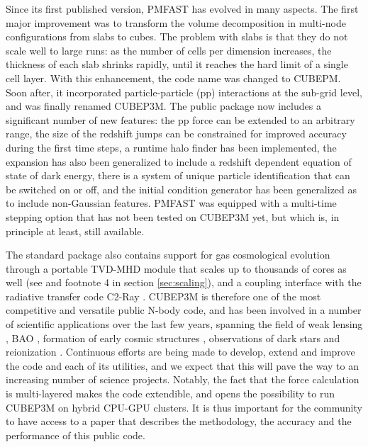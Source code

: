 \documentclass[useAMS,usenatbib]{mn2e}
\begin{document}
Since its first published version, {\small PMFAST} has evolved in many aspects. 
The first major improvement was to transform the volume decomposition in multi-node configurations 
from slabs to cubes. The problem with slabs is that they do not scale well to large runs: 
as the number of cells per dimension increases, the thickness of each slab shrinks rapidly,
until it reaches the hard limit of a single cell layer.  With this enhancement, the code name was changed to {\small CUBEPM}. Soon after, it incorporated particle-particle (pp) interactions at the sub-grid level, 
and was finally renamed {\small CUBEP3M}. The public package now includes a significant number of new features: the pp force
can be extended to an arbitrary range, the size of the redshift jumps can be constrained for improved accuracy during the first time steps,
a runtime halo finder has been implemented, the expansion has also been generalized to include a redshift dependent equation of state of dark energy, there is a system of unique particle identification that can be switched on or off, and the initial condition generator has been generalized as to include non-Gaussian features.
 {\small PMFAST} was equipped with a multi-time stepping option that has not been tested on {\small CUBEP3M} yet, but which is, in principle at least, still available. 
 
 The standard package also contains support for gas cosmological evolution through a portable TVD-MHD module \citep{2003ApJS..149..447P} that scales up to thousands of cores as well (see \citet{2010arXiv1004.1680P} and footnote 4 in section \ref{sec:scaling}), and a coupling interface with the radiative transfer code C2-Ray \citep{2006NewA...11..374M}.
 {\small CUBEP3M} is therefore one of the most competitive and versatile public N-body code, 
 and has been involved in a number of scientific applications over the last few years,
spanning the field of weak lensing \citep{Vafaei10, 2008MNRAS.388.1819L,  2009arXiv0905.0501D, 2010PhRvD..81l3015L, 2010arXiv1012.0444Y, 2012arXiv1202.2332H},  BAO
 \citep{2010arXiv1008.3506Z,  2012MNRAS.419.2949N, 2012MNRAS.423.2288H, 2012arXiv1205.4989H}, 
formation of early cosmic structures \citep{2008arXiv0806.2887I,2010arXiv1005.2502I},
observations of dark stars \citep{2010MNRAS.407L..74Z,2012MNRAS.tmp.2794I} and
reionization \citep{2011arXiv1107.4772I,Fernandez:2011ab,2011MNRAS.413.1353F,2012MNRAS.422..926M,Datta:2011hv,2012arXiv1203.0517F}. 
Continuous efforts are being made to develop, extend and improve the code and each of its utilities, 
and we expect that this will pave the way to an increasing number of science projects. 
Notably, the fact that the force calculation is multi-layered makes the code extendible, 
and opens the possibility to run {\small CUBEP3M} on hybrid CPU-GPU clusters.
It is thus important for the community to have access to a paper that describes the methodology, the accuracy and the performance of this public code. 
\end{document}
